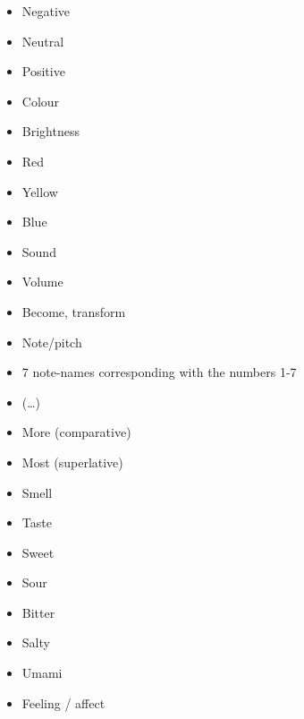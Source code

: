 \begin{multicols}{2}

\begin{itemize}
\item   Negative 

\item   Neutral  

\item   Positive  

\item   Colour 

\item   Brightness 

\item   Red 

\item   Yellow 

\item   Blue 

\item   Sound 

\item   Volume 

\item   Become, transform 

\item   Note/pitch 

\item   7 note-names corresponding with the numbers 1-7 

\item   (…) 

\item   More (comparative)  

\item   Most (superlative) 

\item   Smell 

\item   Taste 

\item   Sweet 

\item   Sour 

\item   Bitter 

\item   Salty 

\item   Umami 

\item   Feeling / affect 


\end{itemize}
\end{multicols}
